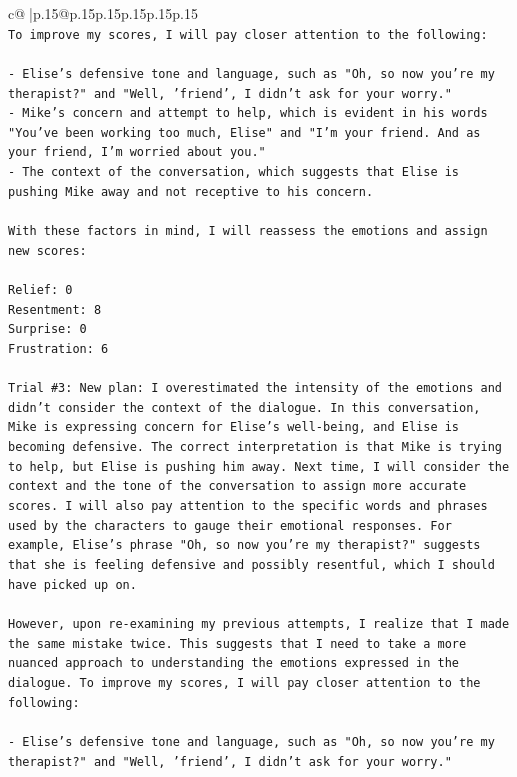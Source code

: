 \documentclass{article}
\begin{document}
{\begin{supertabular}{c@{$\;$}|p{.15\linewidth}@{}p{.15\linewidth}p{.15\linewidth}p{.15\linewidth}p{.15\linewidth}p{.15\linewidth}}
{{{\\ 
\texttt{To improve my scores, I will pay closer attention to the following:} \\
\\ 
\texttt{{-} Elise's defensive tone and language, such as "Oh, so now you're my therapist?" and "Well, 'friend', I didn't ask for your worry."} \\
\texttt{{-} Mike's concern and attempt to help, which is evident in his words "You've been working too much, Elise" and "I'm your friend. And as your friend, I'm worried about you."} \\
\texttt{{-} The context of the conversation, which suggests that Elise is pushing Mike away and not receptive to his concern.} \\
\\ 
\texttt{With these factors in mind, I will reassess the emotions and assign new scores:} \\
\\ 
\texttt{Relief: 0} \\
\texttt{Resentment: 8} \\
\texttt{Surprise: 0} \\
\texttt{Frustration: 6} \\
\\ 
\texttt{Trial \#3: New plan: I overestimated the intensity of the emotions and didn't consider the context of the dialogue. In this conversation, Mike is expressing concern for Elise's well{-}being, and Elise is becoming defensive. The correct interpretation is that Mike is trying to help, but Elise is pushing him away. Next time, I will consider the context and the tone of the conversation to assign more accurate scores. I will also pay attention to the specific words and phrases used by the characters to gauge their emotional responses. For example, Elise's phrase "Oh, so now you're my therapist?" suggests that she is feeling defensive and possibly resentful, which I should have picked up on.} \\
\\ 
\texttt{However, upon re{-}examining my previous attempts, I realize that I made the same mistake twice. This suggests that I need to take a more nuanced approach to understanding the emotions expressed in the dialogue. To improve my scores, I will pay closer attention to the following:} \\
\\ 
\texttt{{-} Elise's defensive tone and language, such as "Oh, so now you're my therapist?" and "Well, 'friend', I didn't ask for your worry."} \\
}}}
\end{supertabular}}
\end{document}
